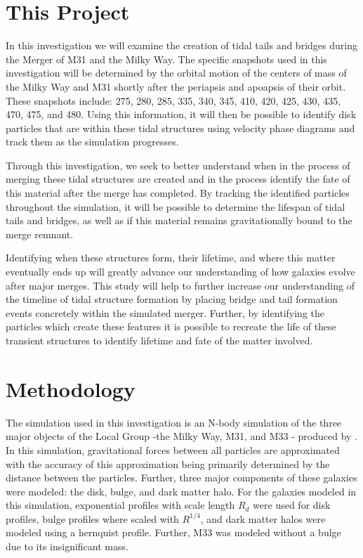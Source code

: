 \documentclass[fleqn,usenatbib]{mnras}
\begin{document}
\section{This Project}

In this investigation we will examine the creation of tidal tails and bridges during the Merger of M31 and the Milky Way. The specific snapshots used in this investigation will be determined by the orbital motion of the centers of mass of the Milky Way and M31 shortly after the periapsis and apoapsis of their orbit. These snapshots include: 275, 280, 285, 335, 340, 345, 410, 420, 425, 430, 435, 470, 475, and 480.
Using this information, it will then be possible to identify disk particles that are within these tidal structures using velocity phase diagrams and track them as the simulation progresses.

Through this investigation, we seek to better understand when in the process of merging these tidal structures are created and in the process identify the fate of this material after the merge has completed. By tracking the identified particles throughout the simulation, it will be possible to determine the lifespan of tidal tails and bridges, as well as if this material remains gravitationally bound to the merge remnant.

Identifying when these structures form, their lifetime, and where this matter eventually ends up will greatly advance our understanding of how galaxies evolve after major merges. This study will help to further increase our understanding of the timeline of tidal structure formation by placing bridge and tail formation events concretely within the simulated merger. Further, by identifying the particles which create these features it is possible to recreate the life of these transient structures to identify lifetime and fate of the matter involved.

\section{Methodology}

The simulation used in this investigation is an N-body simulation of the three major objects of the Local Group -the Milky Way, M31, and M33 - produced by \cite{van_der_Marel_Besla_2012}. In this simulation, gravitational forces between all particles are approximated with the accuracy of this approximation being primarily determined by the distance between the particles. Further, three major components of these galaxies were modeled: the disk, bulge, and dark matter halo. For the galaxies modeled in this simulation, exponential profiles with scale length $R_{d}$ were used for disk profiles, bulge profiles where scaled with $R^{1/4}$, and dark matter halos were modeled using a hernquist profile. Further, M33 was modeled without a bulge due to its insignificant mass.
\end{document}

